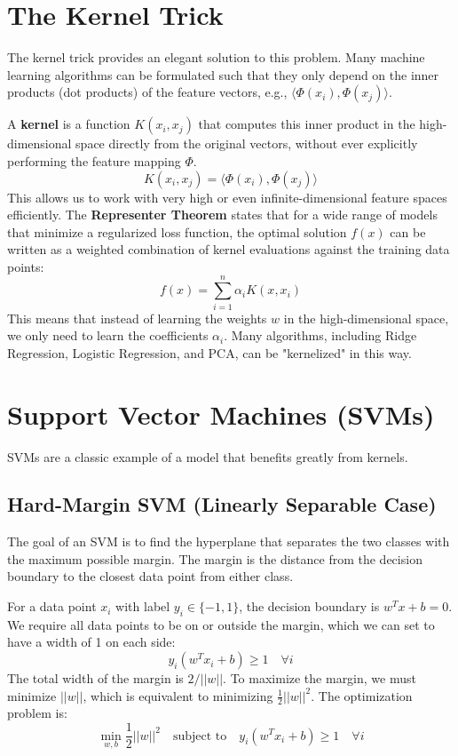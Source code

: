 \documentclass{article}
\begin{document}
\begin{multicols}{2}
\section{The Kernel Trick}
The kernel trick provides an elegant solution to this problem. Many machine learning algorithms can be formulated such that they only depend on the inner products (dot products) of the feature vectors, e.g., $\langle \Phi(x_i), \Phi(x_j) \rangle$.

A \textbf{kernel} is a function $K(x_i, x_j)$ that computes this inner product in the high-dimensional space directly from the original vectors, without ever explicitly performing the feature mapping $\Phi$.
$$ K(x_i, x_j) = \langle \Phi(x_i), \Phi(x_j) \rangle $$
This allows us to work with very high or even infinite-dimensional feature spaces efficiently. The \textbf{Representer Theorem} states that for a wide range of models that minimize a regularized loss function, the optimal solution $f(x)$ can be written as a weighted combination of kernel evaluations against the training data points:
$$ f(x) = \sum_{i=1}^{n} \alpha_i K(x, x_i) $$
This means that instead of learning the weights $w$ in the high-dimensional space, we only need to learn the coefficients $\alpha_i$. Many algorithms, including Ridge Regression, Logistic Regression, and PCA, can be "kernelized" in this way.

\section{Support Vector Machines (SVMs)}
SVMs are a classic example of a model that benefits greatly from kernels.

\subsection{Hard-Margin SVM (Linearly Separable Case)}
The goal of an SVM is to find the hyperplane that separates the two classes with the maximum possible margin. The margin is the distance from the decision boundary to the closest data point from either class.

For a data point $x_i$ with label $y_i \in \{-1, 1\}$, the decision boundary is $w^T x + b = 0$. We require all data points to be on or outside the margin, which we can set to have a width of 1 on each side:
$$ y_i(w^T x_i + b) \ge 1 \quad \forall i $$
The total width of the margin is $2/||w||$. To maximize the margin, we must minimize $||w||$, which is equivalent to minimizing $\frac{1}{2}||w||^2$. The optimization problem is:
$$ \min_{w, b} \frac{1}{2}||w||^2 \quad \text{subject to} \quad y_i(w^T x_i + b) \ge 1 \quad \forall i $$


\end{multicols}
\end{document}
